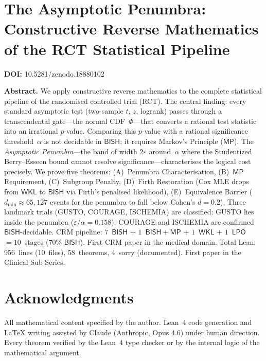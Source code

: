 \documentclass[11pt,a4paper]{article}
\begin{document}
\newpage

\section{The Asymptotic Penumbra: Constructive Reverse Mathematics of the RCT Statistical Pipeline}
\label{sec:p103}
\textbf{DOI:} 10.5281/zenodo.18880102

\bigskip
\noindent\textbf{Abstract.}
We apply constructive reverse mathematics to the complete statistical pipeline of the randomised controlled trial (RCT). The central finding: every standard asymptotic test (two-sample $t$, $z$, logrank) passes through a transcendental gate---the normal CDF~$\Phi$---that converts a rational test statistic into an irrational $p$-value. Comparing this $p$-value with a rational significance threshold~$\alpha$ is not decidable in $\mathsf{BISH}$; it requires Markov's Principle ($\mathsf{MP}$). The \emph{Asymptotic Penumbra}---the band of width $2\varepsilon$ around~$\alpha$ where the Studentized Berry--Esseen bound cannot resolve significance---characterises the logical cost precisely. We prove five theorems: (A)~Penumbra Characterisation, (B)~$\mathsf{MP}$ Requirement, (C)~Subgroup Penalty, (D)~Firth Restoration (Cox MLE drops from $\mathsf{WKL}$ to $\mathsf{BISH}$ via Firth's penalised likelihood), (E)~Equivalence Barrier ($d_{\min} \approx 65{,}127$ events for the penumbra to fall below Cohen's $d = 0.2$). Three landmark trials (GUSTO, COURAGE, ISCHEMIA) are classified: GUSTO lies inside the penumbra ($\varepsilon / \alpha = 0.158$); COURAGE and ISCHEMIA are confirmed $\mathsf{BISH}$-decidable. CRM pipeline: $7$~$\mathsf{BISH}$ $+$ $1$~$\mathsf{BISH}{+}\mathsf{MP}$ $+$ $1$~$\mathsf{WKL}$ $+$ $1$~$\mathsf{LPO}$ $= 10$~stages ($70\%$ $\mathsf{BISH}$). First CRM paper in the medical domain. Total Lean: 956~lines (10~files), 58~theorems, 4~sorry (documented). First paper in the Clinical Sub-Series.

\newpage
\section*{Acknowledgments}

All mathematical content specified by the author. Lean~4 code generation and \LaTeX{} writing assisted by Claude (Anthropic, Opus 4.6) under human direction. Every theorem verified by the Lean~4 type checker or by the internal logic of the mathematical argument.
\end{document}
